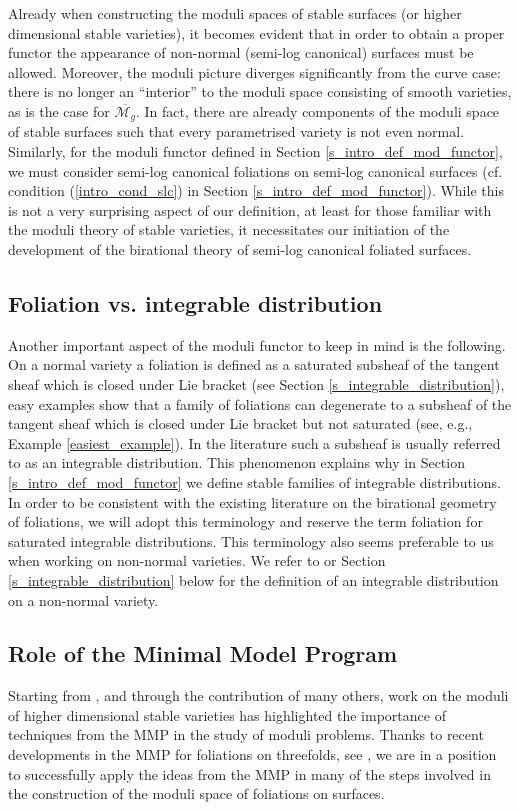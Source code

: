 \documentclass[12pt, a4paper]{amsart}
\theoremstyle{definition}
\theoremstyle{named}
\begin{document}
Already when constructing the moduli spaces of stable surfaces (or higher dimensional stable varieties), it becomes evident that in order to obtain a proper functor the appearance of non-normal (semi-log canonical) surfaces must be allowed.
Moreover, the moduli picture diverges significantly from the curve case:
there is no longer an ``interior'' to the moduli space  consisting of smooth varieties, as is the case for $\overline{\mathcal M_g}$.  
In fact, there are already components of the moduli space of stable surfaces such that every parametrised variety is not even normal.
Similarly, for the moduli functor defined in Section \ref{s_intro_def_mod_functor}, we must consider semi-log canonical foliations on semi-log canonical surfaces (cf. condition 
(\ref{intro_cond_slc}) in Section \ref{s_intro_def_mod_functor}).
While this is not a very surprising aspect of our definition, at least for those familiar with the moduli theory of stable varieties, it necessitates our initiation of the development of the birational theory of semi-log canonical foliated surfaces.


\subsection{Foliation vs. integrable distribution}
\label{note_on_terminolgy}
Another important aspect of the moduli functor to keep in mind is the following.
On a normal variety a foliation is defined as a saturated subsheaf of the tangent sheaf which is closed under Lie bracket (see Section \ref{s_integrable_distribution}), easy examples show that a family of foliations can degenerate to a subsheaf of the tangent sheaf which is closed under Lie bracket but not saturated (see, e.g., Example \ref{easiest_example}).
In the literature such a subsheaf is usually referred to as an integrable distribution.
This phenomenon explains why in Section \ref{s_intro_def_mod_functor} we define stable families of integrable distributions.
In order to be consistent with the existing literature on the birational geometry of foliations, we will adopt this terminology and reserve the term foliation for saturated integrable distributions.  This terminology also seems preferable to us when working on non-normal varieties.  We refer to \cite{CS23b} or Section \ref{s_integrable_distribution} below for the definition of an integrable distribution on a non-normal variety.

\subsection{Role of the Minimal Model Program}
\label{s_intro_role_MMP}
Starting from  \cite{KSB88}, and through the contribution of many others, work on the moduli of higher dimensional stable varieties has highlighted the importance of techniques from the MMP in the study of moduli problems.  
Thanks to recent developments in the MMP for foliations on threefolds, see \cite{McQ05, Spicer20, CS20, CS21, SS22, 2025basepointfreenessrank}, we are in a position to successfully apply the ideas from the MMP in many of the steps involved in the construction of the moduli space of foliations on surfaces. 
\end{document}
